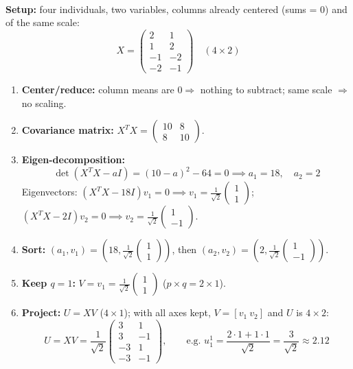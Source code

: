 \documentclass[10pt,a4paper]{article}
\begin{document}
\\[4pt]
\textbf{Setup:} four individuals, two variables, columns already centered (sums = 0) and of the same scale:
\[
X = \begin{pmatrix} 2 & 1 \\ 1 & 2 \\ -1 & -2 \\ -2 & -1 \end{pmatrix} \quad (4 \times 2)
\]
\begin{enumerate}[leftmargin=18pt, itemsep=3pt, topsep=2pt]
    \item \textbf{Center/reduce:} column means are $0 \Rightarrow$ nothing to subtract; same scale $\Rightarrow$ no scaling.
    \item \textbf{Covariance matrix:} $X^T X = \begin{pmatrix} 10 & 8 \\ 8 & 10 \end{pmatrix}$.
    \item \textbf{Eigen-decomposition:}
    \[
    \det(X^T X - a I) = (10 - a)^2 - 64 = 0 \implies a_1 = 18, \quad a_2 = 2
    \]
    Eigenvectors: $(X^TX - 18I)v_1 = 0 \implies v_1 = \frac{1}{\sqrt{2}}\begin{pmatrix} 1 \\ 1 \end{pmatrix}$; \quad
    $(X^TX - 2I)v_2 = 0 \implies v_2 = \frac{1}{\sqrt{2}}\begin{pmatrix} 1 \\ -1 \end{pmatrix}$.
    \item \textbf{Sort:} $(a_1, v_1) = \left(18, \frac{1}{\sqrt{2}}\begin{pmatrix}1\\1\end{pmatrix}\right)$, then $(a_2, v_2) = \left(2, \frac{1}{\sqrt{2}}\begin{pmatrix}1\\-1\end{pmatrix}\right)$.
    \item \textbf{Keep $q = 1$:} $V = v_1 = \frac{1}{\sqrt{2}}\begin{pmatrix} 1 \\ 1 \end{pmatrix}$ ($p \times q = 2 \times 1$).
    \item \textbf{Project:} $U = XV$ ($4 \times 1$); with all axes kept, $V = [v_1 \ v_2]$ and $U$ is $4 \times 2$:
    \[
    U = XV = \frac{1}{\sqrt{2}}\begin{pmatrix} 3 & 1 \\ 3 & -1 \\ -3 & 1 \\ -3 & -1 \end{pmatrix}, \qquad \text{e.g. } u_1^1 = \frac{2\cdot 1 + 1\cdot 1}{\sqrt{2}} = \frac{3}{\sqrt{2}} \approx 2.12
    \]
\end{enumerate}
\end{document}
